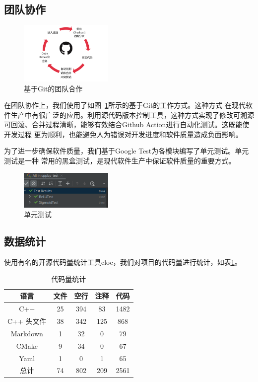 \documentclass[a4paper,twoside,twocolumn]{article}
\begin{document}
\begin{spacing}{1.2}
\subsection{团队协作}
\begin{figure}[htbp]
	\centering
	\caption{基于Git的团队合作}
	\label{fig:coorp}
	\includegraphics[width=0.4\textwidth]{coorp.png}
\end{figure}
在团队协作上，我们使用了如图~\ref{fig:coorp}所示的基于Git的工作方式。这种方式
在现代软件生产中有很广泛的应用。利用源代码版本控制工具，这种方式实现了修改可溯源
可回滚、合并过程清晰，能够有效结合Github Action进行自动化测试。这既能使开发过程
更为顺利，也能避免人为错误对开发进度和软件质量造成负面影响。

为了进一步确保软件质量，我们基于Google Test为各模块编写了单元测试。单元测试是一种
常用的黑盒测试，是现代软件生产中保证软件质量的重要方式。
\begin{figure}[htbp]
	\centering
	\caption{单元测试}
	\label{fig:unittest}
	\includegraphics[width=0.4\textwidth]{unitest.png}
\end{figure}

\subsection{数据统计}

使用有名的开源代码量统计工具cloc，我们对项目的代码量进行统计，如表\ref{tbl:code}。

\begin{table}[htb]
	\centering
	\caption{代码量统计}
	\label{tbl:code}
	\begin{tabular}{c|c|c|c|c}
		\toprule
		\hline 
		语言 & 文件 & 空行 & 注释 & 代码 \\
		\hline 
		C++ & 25 & 394 & 83 & 1482 \\
		C++ 头文件 & 38 & 342 & 125 & 868 \\
		Markdown & 1 & 32 & 0 & 79 \\
		CMake & 9 & 34 & 0 & 67 \\
		Yaml & 1 & 0 & 1 & 65 \\
		\hline 
		总计 & 74 & 802 & 209 & 2561 \\
		\hline 
		\bottomrule
	\end{tabular}
\end{table}



\end{spacing}
\end{document}

